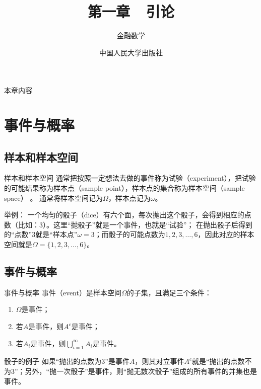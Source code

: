 \documentclass[t]{beamer}
\begin{document}
\fontsize{11}{18}\selectfont


\CTEXindent



  \title{第一章~~引论}
\author{金融数学}
\date{中国人民大学出版社}
  \begin{frame}
    \maketitle
  \end{frame}

\begin{frame}{本章内容}
  \begin{multicols}{2}
    \tableofcontents
  \end{multicols}
\end{frame}

\section{事件与概率}
\subsection{样本和样本空间}
\begin{frame}{样本和样本空间}
  通常把按照一定想法去做的事件称为试验（experiment），把试验的可能结果称为样本点（sample
point），样本点的集合称为样本空间（sample space）
。
通常将样本空间记为$\Omega$，样本点记为$\omega$。

\begin{block}{举例：}
  一个均匀的骰子（dice）有六个面，每次抛出这个骰子，会得到相应的点数（比如：3）。这里“抛骰子”就是一个事件，也就是“试验”；
  在抛出骰子后得到的“点数”3就是“样本点”$\omega=3$；而骰子的可能点数为$1,2,3,\ldots,6$，因此对应的样本空间就是$\Omega=\{1,2,3,\ldots,6\}$。
\end{block}
  
  \end{frame}

  \subsection{事件与概率}
  \begin{frame}{事件与概率}
    事件（event）是样本空间$\Omega$的子集，且满足三个条件：
    \begin{enumerate}
      \item $\Omega$是事件；
      \item 若$A$是事件，则$A^c$是事件；
      \item 若$A_i$是事件，则$\bigcup\limits^{\infty}_{i=1}A_i$是事件。
    \end{enumerate}
  
\begin{block}{骰子的例子}
  如果“抛出的点数为3”是事件$A$，则其对立事件$A^c$就是“抛出的点数不为3”；另外，“抛一次骰子”是事件，则“抛无数次骰子”组成的所有事件的并集也是事件。
\end{block}

  \end{frame}
\end{document}
